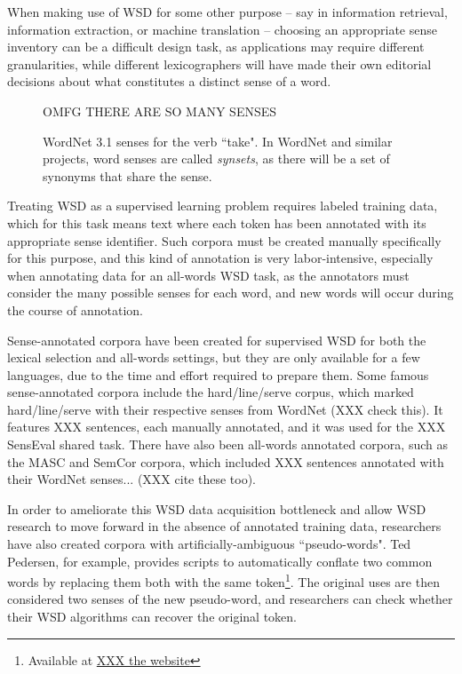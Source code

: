 When making use of WSD for some other purpose -- say in information retrieval,
information extraction, or machine translation -- choosing an appropriate sense
inventory can be a difficult design task, as applications may require different
granularities, while different lexicographers will have made their own
editorial decisions about what constitutes a distinct sense of a word.

\begin{figure}
  OMFG THERE ARE SO MANY SENSES
  \caption{WordNet 3.1 senses for the verb ``take". In WordNet and similar
  projects, word senses are called \emph{synsets}, as there will be a set of
  synonyms that share the sense.}
  \label{fig:wordnet-senses-take}
\end{figure}

Treating WSD as a supervised learning problem requires labeled training data,
which for this task means text where each token has been annotated with its
appropriate sense identifier. 
Such corpora must be created manually specifically for this purpose, and this kind
of annotation is very labor-intensive, especially when annotating data for an
all-words WSD task, as the annotators must consider the many possible senses
for each word, and new words will occur during the course of annotation.

Sense-annotated corpora have been created for supervised WSD for both the lexical
selection and all-words settings, but they are only available for a few
languages, due to the time and effort required to prepare them.
Some famous sense-annotated corpora include the hard/line/serve corpus, which
marked hard/line/serve with their respective senses from WordNet (XXX check
this). It features XXX sentences, each manually annotated, and it was used for
the XXX SensEval shared task.
There have also been all-words annotated corpora, such as the MASC and
SemCor corpora, which included XXX sentences annotated with their WordNet
senses... (XXX cite these too).

In order to ameliorate this WSD data acquisition bottleneck and allow WSD
research to move forward in the absence of annotated training data, researchers
have also created corpora with artificially-ambiguous ``pseudo-words". Ted
Pedersen, for example, provides scripts to automatically conflate two common
words by replacing them both with the same token\footnote{Available at
\url{XXX the website}}. The original uses are then considered two senses of the
new pseudo-word, and researchers can check whether their WSD algorithms can
recover the original token.

